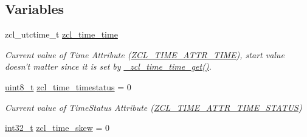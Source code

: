 \subsection*{Variables}
\begin{DoxyCompactItemize}
\item 
zcl\-\_\-utctime\-\_\-t \hyperlink{group__zcl__time_ga4e1da84a7e72ee1626d6328252fd621a}{zcl\-\_\-time\-\_\-time}
\begin{DoxyCompactList}\small\item\em Current value of Time Attribute (\hyperlink{group__zcl__time_ga6abf0e2cc70ac533ebe153a40185be63}{Z\-C\-L\-\_\-\-T\-I\-M\-E\-\_\-\-A\-T\-T\-R\-\_\-\-T\-I\-M\-E}), start value doesn't matter since it is set by \hyperlink{group__zcl__time_ga9c0749b71318a4f7fd28d9112ffd5462}{\-\_\-zcl\-\_\-time\-\_\-time\-\_\-get()}. \end{DoxyCompactList}\item 
\hypertarget{group__zcl__time_ga76f465fead960f138224d8e2a9a59469}{\hyperlink{group__hal_gae1affc9ca37cfb624959c866a73f83c2}{uint8\-\_\-t} \hyperlink{group__zcl__time_ga76f465fead960f138224d8e2a9a59469}{zcl\-\_\-time\-\_\-timestatus} = 0}\label{group__zcl__time_ga76f465fead960f138224d8e2a9a59469}

\begin{DoxyCompactList}\small\item\em Current value of Time\-Status Attribute (\hyperlink{group__zcl__time_ga5931aa648c777cb21c8337249b6e1699}{Z\-C\-L\-\_\-\-T\-I\-M\-E\-\_\-\-A\-T\-T\-R\-\_\-\-T\-I\-M\-E\-\_\-\-S\-T\-A\-T\-U\-S}) \end{DoxyCompactList}\item 
\hypertarget{group__zcl__time_ga999cc34fc0c4c1eb840543f1e8237d29}{\hyperlink{group__hal_gafd12020da5a235dfcf0c3c748fb5baed}{int32\-\_\-t} \hyperlink{group__zcl__time_ga999cc34fc0c4c1eb840543f1e8237d29}{zcl\-\_\-time\-\_\-skew} = 0}\label{group__zcl__time_ga999cc34fc0c4c1eb840543f1e8237d29}


\end{DoxyCompactItemize}
